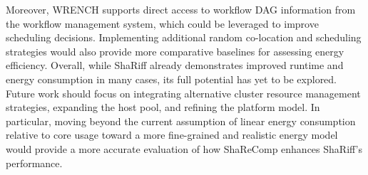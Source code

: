 Moreover, WRENCH supports direct access to workflow DAG information from the workflow management system, which could be leveraged to improve scheduling decisions. Implementing additional random co-location and scheduling strategies would also provide more comparative baselines for assessing energy efficiency.
Overall, while ShaRiff already demonstrates improved runtime and energy consumption in many cases, its full potential has yet to be explored. Future work should focus on integrating alternative cluster resource management strategies, expanding the host pool, and refining the platform model. In particular, moving beyond the current assumption of linear energy consumption relative to core usage toward a more fine-grained and realistic energy model would provide a more accurate evaluation of how ShaReComp enhances ShaRiff's performance.
